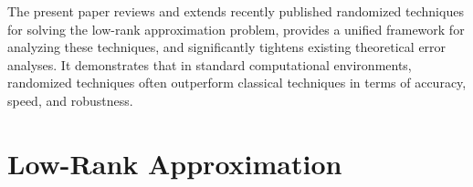 \documentclass{article}
\begin{document}


The present paper reviews and extends recently published randomized
techniques for solving the low-rank approximation problem, provides
a unified framework for analyzing these techniques, and
significantly tightens existing theoretical error analyses. It
demonstrates that in standard computational environments, randomized
techniques often outperform classical techniques in terms of
accuracy, speed, and robustness.

\section{Low-Rank Approximation}
\end{document}
